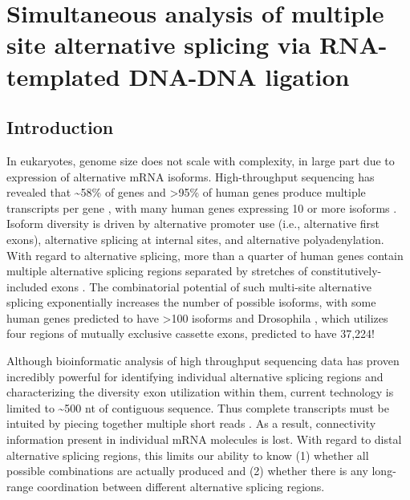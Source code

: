 \chapter{Simultaneous analysis of multiple site alternative splicing via RNA-templated DNA-DNA ligation} 
\label{SeqZipPaper} 
\section{Introduction}
	\label{SeqZipPaper:sec:Introduction}

	In eukaryotes, genome size does not scale with complexity, in large part due to expression of alternative mRNA isoforms. High-throughput sequencing has revealed that \textasciitilde58\% of \flies{} genes and >95\% of human genes produce multiple transcripts per gene \citep{Wang2008,Pan2008,Brown2014}, with many human genes expressing 10 or more isoforms \citep{Djebali2012}. Isoform diversity is driven by alternative promoter use (i.e., alternative first exons), alternative splicing at internal sites, and alternative polyadenylation. With regard to alternative splicing, more than a quarter of human genes contain multiple alternative splicing regions separated by stretches of constitutively-included exons \citep{Fededa2005}. The combinatorial potential of such multi-site alternative splicing exponentially increases the number of possible isoforms, with some human genes predicted to have >100 isoforms and Drosophila \dscam{}, which utilizes four regions of mutually exclusive cassette exons, predicted to have 37,224!

	Although bioinformatic analysis of high throughput sequencing data has proven incredibly powerful for identifying individual alternative splicing regions and characterizing the diversity exon utilization within them, current technology is limited to \textasciitilde 500 nt of contiguous sequence. Thus complete transcripts must be intuited by piecing together multiple short reads \citep{Boley2014,Haas2013c,Grabherr2011,Garber2011a}. As a result, connectivity information present in individual mRNA molecules is lost. With regard to distal alternative splicing regions, this limits our ability to know (1) whether all possible combinations are actually produced and (2) whether there is any long-range coordination between different alternative splicing regions.

